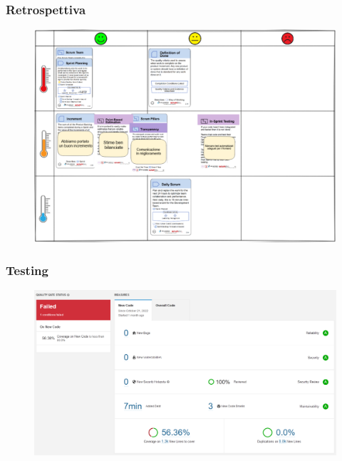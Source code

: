 \documentclass{beamer}
\begin{document}
\begin{frame}
  \frametitle{Retrospettiva}
  \begin{figure}
    \centering
    \includegraphics[width=\textwidth]{./img/retrospettiva.png}
  \end{figure}
\end{frame}

\begin{frame}
  \frametitle{Testing}
  \begin{figure}
    \centering
    \includegraphics[width=\textwidth]{./img/sonarqube.png}
  \end{figure}
\end{frame}
\end{document}
